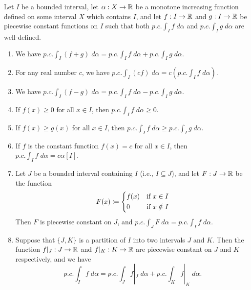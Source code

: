 \begin{ac}\label{ac:11.8.7}
  Let \(I\) be a bounded interval, let \(\alpha : X \to \mathbb{R}\) be a monotone increasing function defined on some interval \(X\) which contains \(I\), and let \(f : I \to \mathbb{R}\) and \(g : I \to \mathbb{R}\) be piecewise constant functions on \(I\) such that both \(p.c. \int_I f \; d \alpha\) and \(p.c. \int_I g \; d \alpha\) are well-defined.
  \begin{enumerate}
    \item We have \(p.c. \int_I (f + g) \; d \alpha = p.c. \int_I f \; d \alpha + p.c. \int_I g \; d \alpha\).
    \item For any real number \(c\), we have \(p.c. \int_I (cf) \; d \alpha = c (p.c. \int_I f \; d \alpha)\).
    \item We have \(p.c. \int_I (f - g) \; d \alpha = p.c. \int_I f \; d \alpha - p.c. \int_I g \; d \alpha\).
    \item If \(f(x) \geq 0\) for all \(x \in I\), then \(p.c. \int_I f \; d \alpha \geq 0\).
    \item If \(f(x) \geq g(x)\) for all \(x \in I\), then \(p.c. \int_I f \; d \alpha \geq p.c. \int_I g \; d \alpha\).
    \item If \(f\) is the constant function \(f(x) = c\) for all \(x \in I\), then \(p.c. \int_I f \; d \alpha = c \alpha[I]\).
    \item Let \(J\) be a bounded interval containing \(I\) (i.e., \(I \subseteq J\)), and let \(F : J \to \mathbb{R}\) be the function
          \[
            F(x) \coloneqq \begin{dcases}
              f(x) & \text{if } x \in I    \\
              0    & \text{if } x \notin I
            \end{dcases}
          \]
          Then \(F\) is piecewise constant on \(J\), and \(p.c. \int_J F \; d \alpha = p.c. \int_I f \; d \alpha\).
    \item Suppose that \(\{J, K\}\) is a partition of \(I\) into two intervals \(J\) and \(K\).
          Then the function \(f|_J : J \to \mathbb{R}\) and \(f|_K : K \to \mathbb{R}\) are piecewise constant on \(J\) and \(K\) respectively, and we have
          \[
            p.c. \int_I f \; d \alpha = p.c. \int_J f|_J \; d \alpha + p.c. \int_K f|_K \; d \alpha.
          \]
  \end{enumerate}
\end{ac}


